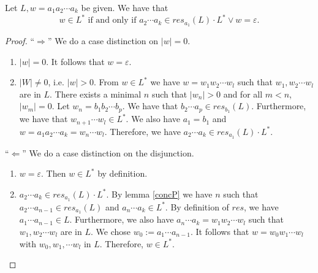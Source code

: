     \begin{lemma}
        \label{starP}
        Let $L, w = a_1 a_2 \cdots a_k$ be given. We have that
        \begin{equation*}
            w \in L^*   
            \mbox{ if and only if } 
            a_2 \cdots a_k \in res_{a_1}(L) \cdot L^* \vee w = \varepsilon.
        \end{equation*}
    \end{lemma}
    \begin{proof}
        ``$\Rightarrow$'' 
        We do a case distinction on $|w| = 0$.
        \begin{enumerate}
            \item
                $|w| = 0$. It follows that $w = \varepsilon$.
            \item
                $|W| \neq 0$, i.e. $|w| > 0$.
                From $w \in L^*$ we have $w = w_1 w_2 \cdots w_l$ such that $w_1, w_2 \cdots w_l$ are in $L$.
                There exists a minimal $n$ such that $|w_n| > 0$ and for all $m < n$, $|w_m| = 0$.
                Let $w_n = b_1 b_2 \cdots b_p$. We have that $b_2 \cdots a_p \in res_{b_1}(L)$.
                Furthermore, we have that $w_{n+1} \cdots w_l \in L^*$.
                We also have $a_1 = b_1$ and $w = a_1 a_2 \cdots a_k = w_n \cdots w_l$. 
                Therefore, we have $a_2 \cdots a_k \in res_{a_1}(L) \cdot L^*$.
        \end{enumerate}
        ``$\Leftarrow$'' 
        We do a case distinction on the disjunction.
        \begin{enumerate}
            \item
                $w = \varepsilon$. Then $w \in L^*$ by definition.
            \item
                $a_2 \cdots a_k \in res_{a_1}(L) \cdot L^*$. 
                By lemma \ref{concP} we have $n$ such that $a_2 \cdots a_{n-1} \in res_{a_1}(L)$ and $a_n \cdots a_k \in L^*$.
                By definition of $res$, we have $a_1 \cdots a_{n-1} \in L$.
                Furthermore, we also have $a_n \cdots a_k = w_1 w_2 \cdots w_l$ such that $w_1, w_2 \cdots w_l$ are in $L$.
                We chose $w_0 := a_1 \cdots a_{n-1}$.
                It follows that $w = w_0 w_1 \cdots w_l$ with $w_0, w_1, \cdots w_l$ in $L$.
                Therefore, $w \in L^*$.
        \end{enumerate}
    \end{proof}



